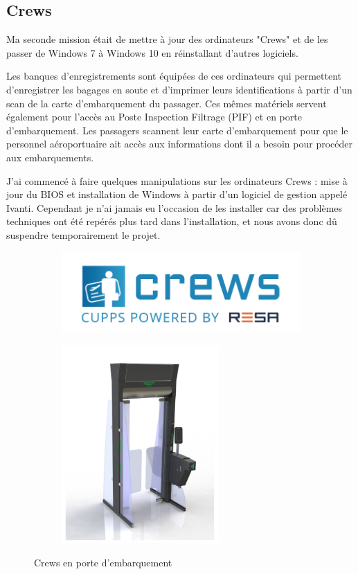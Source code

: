 \newpage


\subsection{Crews}

Ma seconde mission était de mettre à jour des ordinateurs "Crews" et de les passer de Windows 7 à Windows 10 en réinstallant d’autres logiciels.

Les banques d’enregistrements sont équipées de ces ordinateurs qui permettent d’enregistrer les bagages en soute et d’imprimer leurs identifications à partir d’un scan de la carte d’embarquement du passager. Ces mêmes matériels servent également pour l’accès au Poste Inspection Filtrage (PIF) et en porte d’embarquement. Les passagers scannent leur carte d’embarquement pour que le personnel aéroportuaire ait accès aux informations dont il a besoin pour procéder aux embarquements.

J’ai commencé à faire quelques manipulations sur les ordinateurs Crews : mise à jour du BIOS et installation de Windows à partir d’un logiciel de gestion appelé Ivanti. Cependant je n’ai jamais eu l'occasion de les installer car des problèmes techniques ont été repérés plus tard dans l’installation, et nous avons donc dû suspendre temporairement le projet.

\begin{figure}[hbt!]
  \begin{subfigure}{0.5\textwidth}
    \centering
    \includegraphics[width=10cm]{Images/logocrews.png}  
    \label{fig:logocrews}
  \end{subfigure}
  \begin{subfigure}{0.5\textwidth}
    \centering
    \includegraphics[width=6cm]{Images/crews2.png}\newline  
    \label{fig:portecrews}
  \end{subfigure}
  \caption{Crews en porte d'embarquement}
\end{figure}


